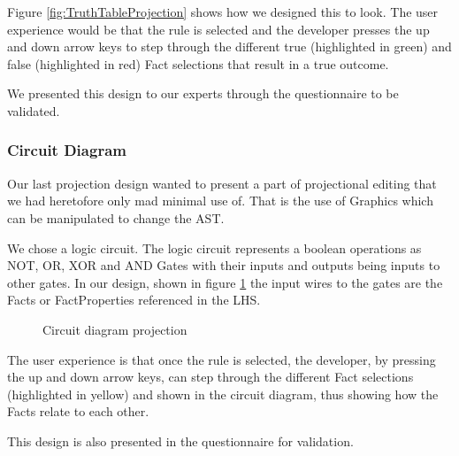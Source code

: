 Figure \ref{fig:TruthTableProjection} shows how we designed this to look.
The user experience would be that the rule is selected and the developer presses the up and down arrow keys to step through the different true (highlighted in green) and false (highlighted in red) Fact selections that result in a true outcome.

We presented this design to our experts through the questionnaire to be validated.

\subsubsection{Circuit Diagram}
Our last projection design wanted to present a part of projectional editing that we had heretofore only mad minimal use of.
That is the use of Graphics which can be manipulated to change the AST.

We chose a logic circuit. The logic circuit represents a boolean operations as NOT, OR, XOR and AND Gates with their inputs and outputs being inputs to other gates.
In our design, shown in figure \ref{fig:CircuitDiagramProjection} the input wires to the gates are the Facts or FactProperties referenced in the LHS.

\begin{figure}[h]
    \centering
    \caption{Circuit diagram projection}
    \label{fig:CircuitDiagramProjection}
\end{figure}

The user experience is that once the rule is selected, the developer, by pressing the up and down arrow keys, can step through the different Fact selections (highlighted in yellow) and shown in the circuit diagram, thus showing how the Facts relate to each other.

This design is also presented in the questionnaire for validation.

